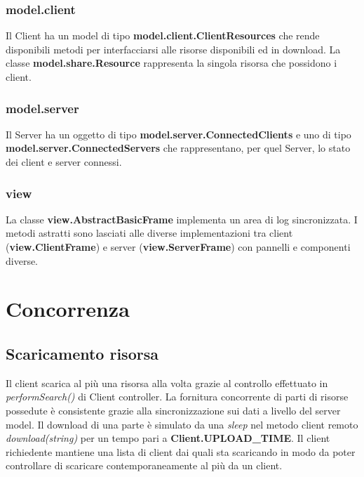 \documentclass[
10pt, %
a4paper, %
oneside, %
BCOR5mm, %
]{scrartcl}
\begin{document}
 		\subsubsection{model.client}
 			
 			Il Client ha un model di tipo \textbf{model.client.ClientResources} che rende disponibili metodi per interfacciarsi alle risorse disponibili ed in download.
 			La classe \textbf{model.share.Resource} rappresenta la singola risorsa che possidono i client.
 			
 		\subsubsection{model.server}

 			Il Server ha un oggetto di tipo \textbf{model.server.ConnectedClients} e uno di tipo \textbf{model.server.ConnectedServers} che rappresentano, per quel Server, lo stato dei client e server connessi.

 		\subsubsection{view}

 			La classe \textbf{view.AbstractBasicFrame} implementa un area di log sincronizzata. I metodi astratti sono lasciati alle diverse implementazioni tra client (\textbf{view.ClientFrame}) e server (\textbf{view.ServerFrame}) con pannelli e componenti diverse.


\section{Concorrenza}

	\subsection{Scaricamento risorsa}
	Il client scarica al più una risorsa alla volta grazie al controllo effettuato in \emph{performSearch()} di Client controller. La fornitura concorrente di parti di risorse possedute è consistente grazie alla sincronizzazione sui dati a livello del server model. Il download di una parte è simulato da una \emph{sleep} nel metodo client remoto \textit{download(string)} per un tempo pari a \textbf{Client.UPLOAD\_TIME}. Il client richiedente mantiene una lista di client dai quali sta scaricando in modo da poter controllare di scaricare contemporaneamente al più da un client. 
\end{document}
